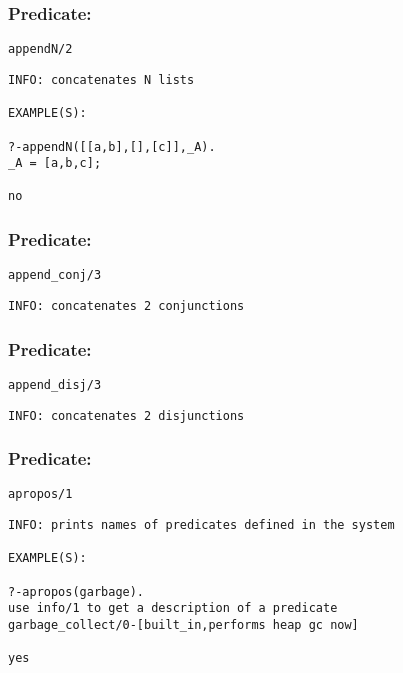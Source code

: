 \subsubsection{Predicate:} \label{appendNV95W2}

\begin{verbatim}
appendN/2
\end{verbatim}

{\small \begin{verbatim}
INFO: concatenates N lists

EXAMPLE(S):

?-appendN([[a,b],[],[c]],_A).
_A = [a,b,c];

no

\end{verbatim}}

\subsubsection{Predicate:} \label{appendV95WconjV95W3}

\begin{verbatim}
append_conj/3
\end{verbatim}

{\small \begin{verbatim}
INFO: concatenates 2 conjunctions

\end{verbatim}}

\subsubsection{Predicate:} \label{appendV95WdisjV95W3}

\begin{verbatim}
append_disj/3
\end{verbatim}

{\small \begin{verbatim}
INFO: concatenates 2 disjunctions

\end{verbatim}}

\subsubsection{Predicate:} \label{aproposV95W1}

\begin{verbatim}
apropos/1
\end{verbatim}

{\small \begin{verbatim}
INFO: prints names of predicates defined in the system

EXAMPLE(S):

?-apropos(garbage).
use info/1 to get a description of a predicate
garbage_collect/0-[built_in,performs heap gc now]

yes

\end{verbatim}}
